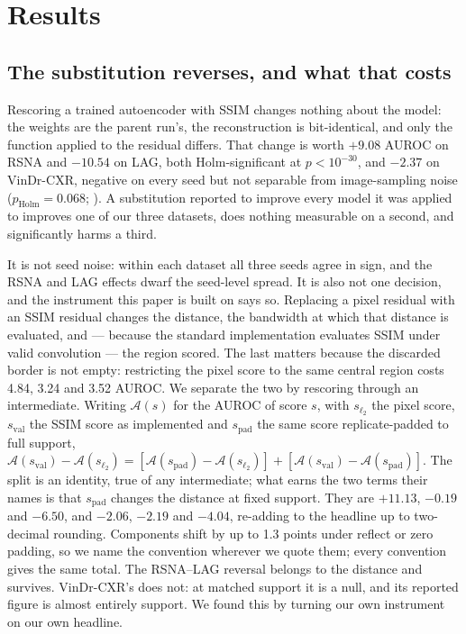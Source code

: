 \documentclass[pmlr,twocolumn,10pt]{jmlr} %
\begin{document}
\section{Results}
\label{sec:results}

\subsection{The substitution reverses, and what that costs}
Rescoring a trained autoencoder with SSIM changes nothing about the model: the weights are
the parent run's, the reconstruction is bit-identical, and only the function applied to the
residual differs. That change is worth $+9.08$ AUROC on RSNA and $-10.54$ on LAG, both
Holm-significant at $p<10^{-30}$, and $-2.37$ on VinDr-CXR, negative on every seed but not
separable from image-sampling noise ($p_{\mathrm{Holm}}=0.068$; ).
A substitution reported to improve every model it was applied to improves one of our three
datasets, does nothing measurable on a second, and significantly harms a third.

It is not seed noise: within each dataset all three seeds agree in sign, and the RSNA and
LAG effects dwarf the seed-level spread. It is also not one decision, and the instrument
this paper is built on says so. Replacing a pixel residual with an SSIM residual changes the distance, the bandwidth at
which that distance is evaluated, and --- because the standard implementation evaluates SSIM
under valid convolution --- the region scored. The last matters because the discarded border
is not empty: restricting the pixel score to the same central region costs 4.84, 3.24 and
3.52 AUROC. We separate the two by rescoring through an
intermediate. Writing $\mathcal{A}(s)$ for the AUROC of score $s$, with $s_{\ell_2}$ the
pixel score, $s_{\mathrm{val}}$ the SSIM score as implemented and $s_{\mathrm{pad}}$ the same
score replicate-padded to full support, $\mathcal{A}(s_{\mathrm{val}}) -
\mathcal{A}(s_{\ell_2}) = [\mathcal{A}(s_{\mathrm{pad}}) - \mathcal{A}(s_{\ell_2})] +
[\mathcal{A}(s_{\mathrm{val}}) - \mathcal{A}(s_{\mathrm{pad}})]$. The split is an identity, true of any
intermediate; what earns the two terms their names is that $s_{\mathrm{pad}}$ changes the
distance at fixed support. They are $+11.13$, $-0.19$ and $-6.50$, and $-2.06$, $-2.19$ and
$-4.04$, re-adding to the headline up to two-decimal rounding. Components shift by up to
1.3 points under reflect or zero padding, so we name the convention wherever we quote them;
every convention gives the same total. The
RSNA--LAG reversal belongs to the distance and survives. VinDr-CXR's does not: at matched
support it is a null, and its reported figure is almost entirely support. We found this by
turning our own instrument on our own headline.
\end{document}
